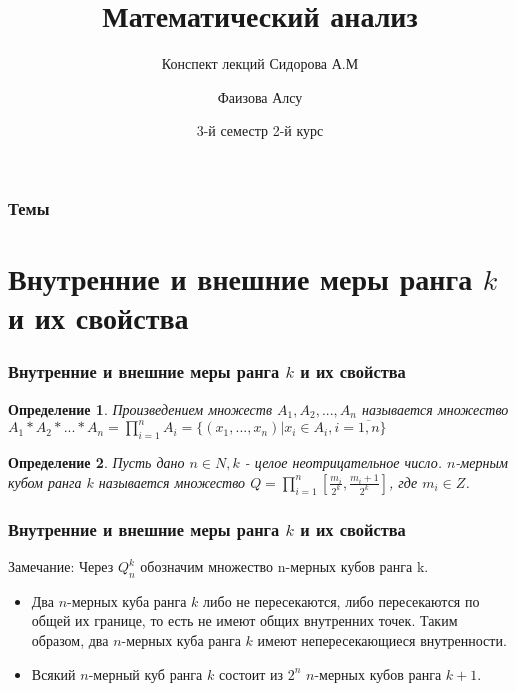 \documentclass{beamer}
\title{Математический анализ}
\subtitle{Конспект лекций Сидорова А.М}
\author{Фаизова Алсу}
\institute{ИВМиИТ}
\date[КФУ 2020] {3-й семестр 2-й курс}
\newtheorem{ru_def}{Определение}
\renewenvironment{definition}{\begin{ru_def}}{\end{ru_def}}
\begin{document}
\begin{frame}
\titlepage
\end{frame}

\begin{frame}
\frametitle{Темы}
\tableofcontents
\end{frame}

\section{Внутренние и внешние меры ранга $k$ и их свойства}

\begin{frame}
\frametitle{Внутренние и внешние меры ранга $k$ и их свойства}
	\begin{definition} 
	\textit{Произведением множеств} $A_1, A_2, ..., A_n$ называется множество $A_1*A_2*...*A_n = \prod_{i=1}^{n} A_i = \{(x_1, ..., x_n)|x_i \in A_i, i =\overline{1,n}\}$
	\end{definition}

	\begin{definition}
	 Пусть дано $n \in N, k $ - целое неотрицательное число. 
	\textit{$n$-мерным кубом ранга $k$} называется множество $Q = \prod_{i=1}^{n}[\frac{m_i}{2^k},\frac{m_i + 1}{2^k}]$, где $m_i \in Z$.
	\end{definition}
\end{frame}

\begin{frame}
\frametitle{Внутренние и внешние меры ранга $k$ и их свойства}

	\begin{exampleblock}{Замечание:}
	 Через $Q_n^k$ обозначим множество n-мерных кубов ранга k.
	\begin{itemize}
	\item Два $n$-мерных куба ранга $k$ либо не пересекаются, либо пересекаются по общей их границе, то есть не имеют общих внутренних точек. Таким образом, два $n$-мерных куба ранга $k$ имеют непересекающиеся внутренности.
	\item Всякий $n$-мерный куб ранга $k$ состоит из $2^n$ $n$-мерных кубов ранга $k+1$.
	\end{itemize}
	\end{exampleblock}
\end{frame}
\end{document}
